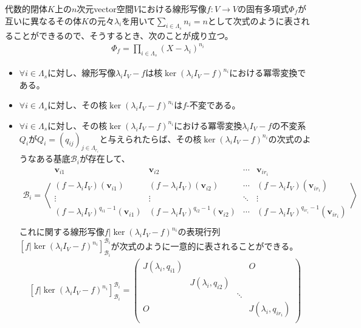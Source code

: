 \documentclass[dvipdfmx]{jsarticle}
\begin{document}
\begin{thm}\label{2.2.6.1}
代数的閉体$K$上の$n$次元vector空間$V$における線形写像$f:V \rightarrow V$の固有多項式$\varPhi_{f}$が互いに異なるその体$K$の元々$\lambda_{i}$を用いて$\sum_{i \in \varLambda_{s}} n_{i} = n$として次式のように表されることができるので、そうするとき、次のことが成り立つ。
\begin{align*}
\varPhi_{f} = \prod_{i \in \varLambda_{s}} \left( X - \lambda_{i} \right)^{n_{i}}
\end{align*}
\begin{itemize}
\item
  $\forall i \in \varLambda_{s}$に対し、線形写像$\lambda_{i}I_{V} - f$は核$\ker\left( \lambda_{i}I_{V} - f \right)^{n_{i}}$における冪零変換である。
\item
  $\forall i \in \varLambda_{s}$に対し、その核$\ker\left( \lambda_{i}I_{V} - f \right)^{n_{i}}$は$f$-不変である。
\item
  $\forall i \in \varLambda_{s}$に対し、その核$\ker\left( \lambda_{i}I_{V} - f \right)^{n_{i}}$における冪零変換$\lambda_{i}I_{V} - f$の不変系$Q_{i}$が$Q_{i} = \left( q_{ij} \right)_{j \in \varLambda_{r_{i}}}$と与えられたらば、その核$\ker\left( \lambda_{i}I_{V} - f \right)^{n_{i}}$の次式のようなある基底$\mathcal{B}_{i}$が存在して、
\begin{align*}
\mathcal{B}_{i} = \left\langle \begin{matrix}
\mathbf{v}_{i1} & \mathbf{v}_{i2} & \cdots & \mathbf{v}_{ir_{i}} \\
\left( f - \lambda_{i}I_{V} \right)\left( \mathbf{v}_{i1} \right) & \left( f - \lambda_{i}I_{V} \right)\left( \mathbf{v}_{i2} \right) & \cdots & \left( f - \lambda_{i}I_{V} \right)\left( \mathbf{v}_{ir_{i}} \right) \\
 \vdots & \vdots & \ddots & \vdots \\
\left( f - \lambda_{i}I_{V} \right)^{q_{i1} - 1}\left( \mathbf{v}_{i1} \right) & \left( f - \lambda_{i}I_{V} \right)^{q_{i2} - 1}\left( \mathbf{v}_{i2} \right) & \cdots & \left( f - \lambda_{i}I_{V} \right)^{q_{ir_{i}} - 1}\left( \mathbf{v}_{ir_{i}} \right) \\
\end{matrix} \right\rangle
\end{align*}
これに関する線形写像$f|\ker\left( \lambda_{i}I_{V} - f \right)^{n_{i}}$の表現行列$\left[ f|\ker\left( \lambda_{i}I_{V} - f \right)^{n_{i}} \right]_{\mathcal{B}_{i}}^{\mathcal{B}_{i}}$が次式のように一意的に表されることができる。
\begin{align*}
\left[ f|\ker\left( \lambda_{i}I_{V} - f \right)^{n_{i}} \right]_{\mathcal{B}_{i}}^{\mathcal{B}_{i}} = \begin{pmatrix}
J\left( \lambda_{i},q_{i1} \right) & \  & \  & O \\
\  & J\left( \lambda_{i},q_{i2} \right) & \  & \  \\
\  & \  & \ddots & \  \\
O & \  & \  & J\left( \lambda_{i},q_{ir_{i}} \right) \\
\end{pmatrix}
\end{align*}
\end{itemize}
\end{thm}
\end{document}
